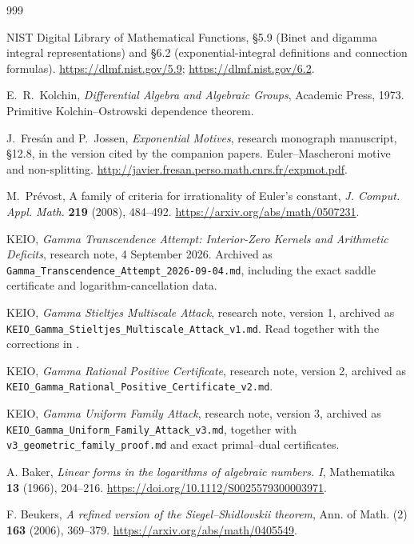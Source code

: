 \documentclass[11pt,a4paper]{article}
\theoremstyle{definition}
\theoremstyle{remark}
\numberwithin{equation}{section}
\begin{document}
\clearpage
\begin{thebibliography}{999}
\small
{}
NIST Digital Library of Mathematical Functions,
\S5.9 (Binet and digamma integral representations) and \S6.2
(exponential-integral definitions and connection formulas).
\url{https://dlmf.nist.gov/5.9}; \url{https://dlmf.nist.gov/6.2}.

E.~R.~Kolchin, \emph{Differential Algebra and Algebraic Groups},
Academic Press, 1973.  Primitive Kolchin--Ostrowski dependence theorem.

J.~Fres\'an and P.~Jossen, \emph{Exponential Motives},
research monograph manuscript, \S12.8, in the version cited by the
companion papers.  Euler--Mascheroni motive and non-splitting.
\url{http://javier.fresan.perso.math.cnrs.fr/expmot.pdf}.

M.~Pr\'evost, A family of criteria for irrationality of Euler's constant,
\emph{J. Comput. Appl. Math.} \textbf{219} (2008), 484--492.
\url{https://arxiv.org/abs/math/0507231}.

KEIO, \emph{Gamma Transcendence Attempt: Interior-Zero Kernels and
Arithmetic Deficits}, research note, 4 September 2026.
Archived as \texttt{Gamma\_Transcendence\_Attempt\_2026-09-04.md},
including the exact saddle certificate and logarithm-cancellation data.

KEIO, \emph{Gamma Stieltjes Multiscale Attack}, research note,
version 1, archived as
\texttt{KEIO\_Gamma\_Stieltjes\_Multiscale\_Attack\_v1.md}.
Read together with the corrections in \cite{fd:positivev2}.

KEIO, \emph{Gamma Rational Positive Certificate}, research note,
version 2, archived as
\texttt{KEIO\_Gamma\_Rational\_Positive\_Certificate\_v2.md}.

KEIO, \emph{Gamma Uniform Family Attack}, research note,
version 3, archived as
\texttt{KEIO\_Gamma\_Uniform\_Family\_Attack\_v3.md}, together with
\texttt{v3\_geometric\_family\_proof.md} and exact primal--dual certificates.





A. Baker,
\emph{Linear forms in the logarithms of algebraic numbers. I},
Mathematika \textbf{13} (1966), 204--216.
\url{https://doi.org/10.1112/S0025579300003971}.

F. Beukers,
\emph{A refined version of the Siegel--Shidlovskii theorem},
Ann. of Math. (2) \textbf{163} (2006), 369--379.
\url{https://arxiv.org/abs/math/0405549}.


\end{thebibliography}
\end{document}
